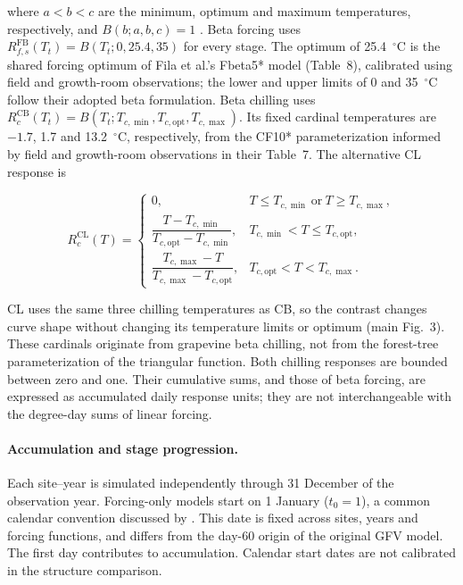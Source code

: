 \documentclass[a4paper,11pt]{article}
\begin{document}
where $a<b<c$ are the minimum, optimum and maximum temperatures, respectively, and $B(b;a,b,c)=1$ \citep{filaComparisonDifferentModelling2014}. Beta forcing uses $R^{\mathrm{FB}}_{f,s}(T_t)=B(T_t;0,25.4,35)$ for every stage. The optimum of 25.4~$^{\circ}$C is the shared forcing optimum of Fila et al.'s Fbeta5* model (Table~8), calibrated using field and growth-room observations; the lower and upper limits of 0 and 35~$^{\circ}$C follow their adopted beta formulation. Beta chilling uses $R^{\mathrm{CB}}_c(T_t)=B(T_t;T_{c,\min},T_{c,\mathrm{opt}},T_{c,\max})$. Its fixed cardinal temperatures are $-1.7$, 1.7 and 13.2~$^{\circ}$C, respectively, from the CF10* parameterization informed by field and growth-room observations in their Table~7. The alternative CL response is

\begin{equation}
R^{\mathrm{CL}}_c(T)=
\begin{cases}
0, & T\leq T_{c,\min}\ \text{or}\ T\geq T_{c,\max},\\[3pt]
\dfrac{T-T_{c,\min}}{T_{c,\mathrm{opt}}-T_{c,\min}}, & T_{c,\min}<T\leq T_{c,\mathrm{opt}},\\[6pt]
\dfrac{T_{c,\max}-T}{T_{c,\max}-T_{c,\mathrm{opt}}}, & T_{c,\mathrm{opt}}<T<T_{c,\max}.
\end{cases}
\label{eq:triangular_chilling}
\end{equation}

CL uses the same three chilling temperatures as CB, so the contrast changes curve shape without changing its temperature limits or optimum (main Fig.~3). These cardinals originate from grapevine beta chilling, not from the forest-tree parameterization of the triangular function. Both chilling responses are bounded between zero and one. Their cumulative sums, and those of beta forcing, are expressed as accumulated daily response units; they are not interchangeable with the degree-day sums of linear forcing.

\paragraph{Accumulation and stage progression.}
Each site--year is simulated independently through 31 December of the observation year. Forcing-only models start on 1 January ($t_0=1$), a common calendar convention discussed by \citet{filaComparisonDifferentModelling2014}. This date is fixed across sites, years and forcing functions, and differs from the day-60 origin of the original GFV model. The first day contributes to accumulation. Calendar start dates are not calibrated in the structure comparison.
\end{document}
